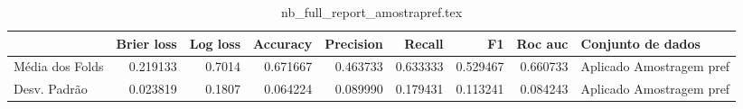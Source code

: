 \begin{table}
\centering
\caption{nb_full_report_amostrapref.tex}
\label{nb_full_report_amostrapref.tex}
\begin{tabular}{lrrrrrrrl}
\toprule
{} &  Brier  loss &  Log loss &  Accuracy  &  Precision  &   Recall  &       F1  &  Roc auc  &         Conjunto de dados \\
\midrule
Média dos Folds &     0.219133 &    0.7014 &   0.671667 &    0.463733 &  0.633333 &  0.529467 &  0.660733 &  Aplicado Amostragem pref \\
Desv. Padrão    &     0.023819 &    0.1807 &   0.064224 &    0.089990 &  0.179431 &  0.113241 &  0.084243 &  Aplicado Amostragem pref \\
\bottomrule
\end{tabular}
\end{table}
